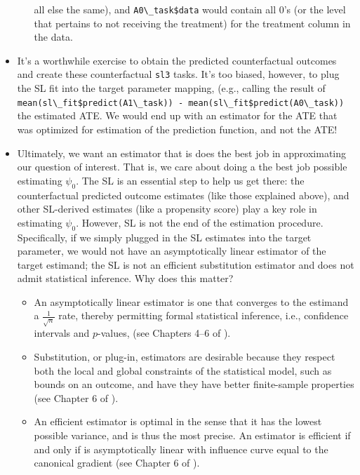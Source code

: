 \documentclass[
  12pt, krantz2,
]{krantz}
\newcommand{\passthrough}[1]{#1}
\newcommand{\1}{\mathbbm{1}}
\theoremstyle{definition}
\theoremstyle{definition}
\theoremstyle{definition}
\theoremstyle{definition}
\theoremstyle{remark}
\begin{document}
\begin{itemize}
\begin{itemize}
    all else the same), and \passthrough{\lstinline!A0\_task$data!} would contain all 0's (or the
    level that pertains to not receiving the treatment) for the treatment
    column in the data.
  \end{itemize}
\item
  It's a worthwhile exercise to obtain the predicted counterfactual outcomes
  and create these counterfactual \passthrough{\lstinline!sl3!} tasks. It's too biased, however, to
  plug the SL fit into the target parameter mapping, (e.g., calling the result
  of \passthrough{\lstinline!mean(sl\_fit$predict(A1\_task)) - mean(sl\_fit$predict(A0\_task))!} the
  estimated ATE. We would end up with an estimator for the ATE that was
  optimized for estimation of the prediction function, and not the ATE!
\item
  Ultimately, we want an estimator that is does the best job in approximating
  our question of interest. That is, we care about doing a the best job
  possible estimating \(\psi_0\). The SL is an essential step to help us get
  there: the counterfactual predicted outcome estimates (like those
  explained above), and other SL-derived estimates (like a propensity score)
  play a key role in estimating \(\psi_0\). However, SL is not the end of the
  estimation procedure. Specifically, if we simply plugged in the SL estimates
  into the target parameter, we would not have an asymptotically linear
  estimator of the target estimand; the SL is not an efficient substitution
  estimator and does not admit statistical inference. Why does this matter?

  \begin{itemize}
  \item
    An asymptotically linear estimator is one that converges to the estimand a
    \(\frac{1}{\sqrt{n}}\) rate, thereby permitting formal statistical inference,
    i.e., confidence intervals and \(p\)-values, (see Chapters 4--6 of
    \citet{vdl2011targeted}).
  \item
    Substitution, or plug-in, estimators are desirable because they respect
    both the local and global constraints of the statistical model, such as
    bounds on an outcome, and have they have better finite-sample properties
    (see Chapter 6 of \citet{vdl2011targeted}).
  \item
    An efficient estimator is optimal in the sense that it has the lowest
    possible variance, and is thus the most precise. An estimator is efficient
    if and only if is asymptotically linear with influence curve equal to the
    canonical gradient (see Chapter 6 of \citet{vdl2011targeted}).


\end{itemize}
\end{itemize}
\end{document}
